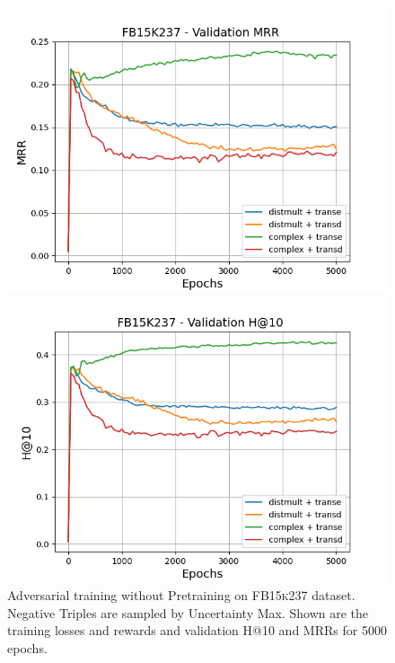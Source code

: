 \begin{figure}
\begin{minipage}{.5\textwidth}
    \end{minipage}
    \begin{minipage}{.5\textwidth}
      \centering
      \includegraphics[width=0.9\linewidth]{figures/results/gan_train/not_pretrained/uncertainty/max/entropy/fb15k237/gan_train_uncertainty_fb15k237_mrrs.png}
    \end{minipage}%
    \begin{minipage}{.5\textwidth}
      \centering
      \includegraphics[width=0.9\linewidth]{figures/results/gan_train/not_pretrained/uncertainty/max/entropy/fb15k237/gan_train_uncertainty_fb15k237_hit10s.png}
    \end{minipage}%
    \caption{Adversarial training without Pretraining on \textsc{FB15k237} dataset. 
    Negative Triples are sampled by Uncertainty Max.
    Shown are the training losses and rewards and validation H@10 and MRRs for 5000 epochs.}
    \label{fig:advtrain_fb15k237_not_pretrained_uncertainty_max}
\end{figure}

